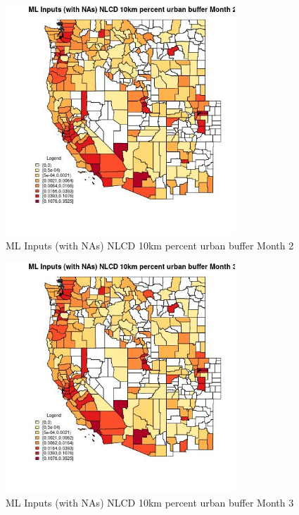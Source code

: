 \begin{figure} 
\centering  
\includegraphics[width=0.77\textwidth]{Code_Outputs/Report_ML_input_PM25_Step4_part_f_de_duplicated_aveswNAs_CountyNLCD_10km_percent_urban_buffermedianMonth2.jpg} 
\caption{\label{fig:Report_ML_input_PM25_Step4_part_f_de_duplicated_aveswNAsCountyNLCD_10km_percent_urban_buffermedianMonth2}ML Inputs (with NAs) NLCD 10km percent urban buffer Month 2} 
\end{figure} 
 

\begin{figure} 
\centering  
\includegraphics[width=0.77\textwidth]{Code_Outputs/Report_ML_input_PM25_Step4_part_f_de_duplicated_aveswNAs_CountyNLCD_10km_percent_urban_buffermedianMonth3.jpg} 
\caption{\label{fig:Report_ML_input_PM25_Step4_part_f_de_duplicated_aveswNAsCountyNLCD_10km_percent_urban_buffermedianMonth3}ML Inputs (with NAs) NLCD 10km percent urban buffer Month 3} 
\end{figure} 
 

